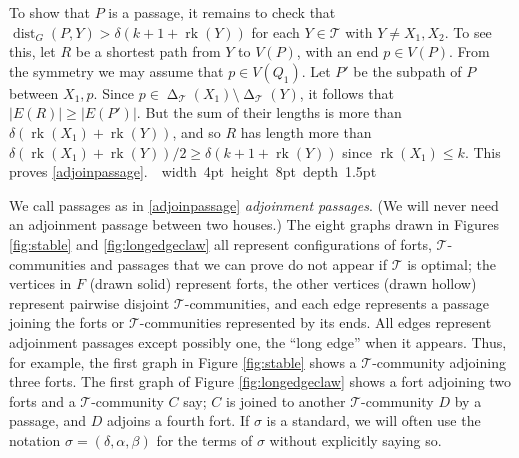 \documentclass[titlepage,11pt]{article}
\newcommand\blackslug{\hbox{\hskip 1pt \vrule width 4pt height 8pt depth 1.5pt
		\hskip 1pt}}
\newcommand\bbox{\hfill \quad \blackslug \bigbreak}
\newcommand{\dist}{\operatorname{dist}}
\newcommand{\voro}{\operatorname{\Delta}}
\newcommand{\rk}{\operatorname{rk}}
\newcommand{\mac}{\mathcal}
\begin{document}
	To show that $P$ is a passage, it remains to check that $\dist_G(P,Y)>  \delta(k+1+\rk(Y))$ for each $Y\in \mac T$ with $Y\ne X_1,X_2$. To see this, let $R$ be a shortest path from $Y$ to $V(P)$, with an end $p\in V(P)$. From the symmetry we may assume that $p\in V(Q_1)$.
	Let $P'$ be the subpath of $P$ between $X_1,p$. Since $p\in \voro_{\mac T}(X_1) \setminus \voro_{\mac T}(Y)$, it follows that $|E(R)|\ge |E(P')|$.
	But the sum of their lengths is more than $\delta(\rk(X_1)+\rk(Y))$, and so $R$ has length more than
	$\delta(\rk(X_1)+\rk(Y))/2\ge \delta(k+1+\rk(Y))$ since $\rk(X_1)\le k$. This proves \ref{adjoinpassage}.~\bbox
	
	
	We call passages as in \ref{adjoinpassage} {\em adjoinment passages}. (We will never need an adjoinment passage between two houses.)
	The eight graphs drawn in Figures \ref{fig:stable} and \ref{fig:longedgeclaw} all 
	represent configurations of forts, $\mac T$-communities and passages that we can prove do not appear if $\mac T$ is optimal; the 
	vertices in $F$ (drawn solid)
	represent forts, the other vertices (drawn hollow) represent pairwise disjoint $\mac T$-communities, and each edge represents a passage joining the forts or 
	$\mac T$-communities represented by its ends. All edges represent 
	adjoinment passages 
	except possibly one, the ``long edge'' when it appears. Thus, for example, the first graph in Figure \ref{fig:stable} shows a $\mac T$-community adjoining three forts. The first graph of Figure \ref{fig:longedgeclaw} shows a fort adjoining two forts and a $\mac T$-community $C$ say;
	$C$ is joined to another $\mac T$-community $D$ by a passage, and $D$ adjoins a fourth fort. 
	If $\sigma$ is a standard, we will often use the notation $\sigma=(\delta, \alpha,\beta)$ for the terms of $\sigma$
	without explicitly saying so.
	
\end{document}
